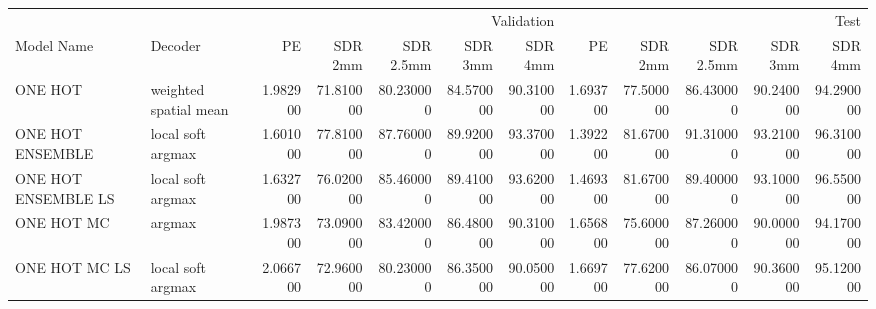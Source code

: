 \begin{tabular}{llrrrrrrrrrr}
\toprule
\multicolumn{2}{r}{} & \multicolumn{5}{r}{Validation} & \multicolumn{5}{r}{Test} \\
Model Name & Decoder & PE & SDR 2mm & SDR 2.5mm & SDR 3mm & SDR 4mm & PE & SDR 2mm & SDR 2.5mm & SDR 3mm & SDR 4mm \\
\midrule
ONE HOT & weighted spatial mean & 1.982900 & 71.810000 & 80.230000 & 84.570000 & 90.310000 & 1.693700 & 77.500000 & 86.430000 & 90.240000 & 94.290000 \\
ONE HOT ENSEMBLE & local soft argmax & 1.601000 & 77.810000 & 87.760000 & 89.920000 & 93.370000 & 1.392200 & 81.670000 & 91.310000 & 93.210000 & 96.310000 \\
ONE HOT ENSEMBLE LS & local soft argmax & 1.632700 & 76.020000 & 85.460000 & 89.410000 & 93.620000 & 1.469300 & 81.670000 & 89.400000 & 93.100000 & 96.550000 \\
ONE HOT MC & argmax & 1.987300 & 73.090000 & 83.420000 & 86.480000 & 90.310000 & 1.656800 & 75.600000 & 87.260000 & 90.000000 & 94.170000 \\
ONE HOT MC LS & local soft argmax & 2.066700 & 72.960000 & 80.230000 & 86.350000 & 90.050000 & 1.669700 & 77.620000 & 86.070000 & 90.360000 & 95.120000 \\
\bottomrule
\end{tabular}
